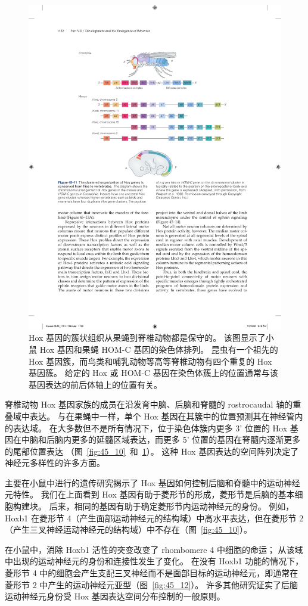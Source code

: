 \begin{figure}[htbp]
	\centering
	\includegraphics[width=0.7\linewidth]{chap45/fig_45_11}
	\caption{Hox 基因的簇状组织从果蝇到脊椎动物都是保守的。
		该图显示了小鼠 Hox 基因和果蝇 HOM-C 基因的染色体排列。
		昆虫有一个祖先的 Hox 基因簇，而鸟类和哺乳动物等高等脊椎动物有四个重复的 Hox 基因簇。
		给定的 Hox 或 HOM-C 基因在染色体簇上的位置通常与该基因表达的前后体轴上的位置有关\cite{wolpert2015principles}。 }
	\label{fig:45_11}
\end{figure}


脊椎动物 Hox 基因家族的成员在沿发育中脑、后脑和脊髓的 rostrocaudal 轴的重叠域中表达。
与在果蝇中一样，单个 Hox 基因在其簇中的位置预测其在神经管内的表达域。
在大多数但不是所有情况下，位于染色体簇内更多 3' 位置的 Hox 基因在中脑和后脑内更多的延髓区域表达，而更多 5' 位置的基因在脊髓内逐渐更多的尾部位置表达 （图~\ref{fig:45_10}~和~\ref{fig:45_11}）。
这种 Hox 基因表达的空间阵列决定了神经元多样性的许多方面。


主要在小鼠中进行的遗传研究揭示了 Hox 基因如何控制后脑和脊髓中的运动神经元特性。
我们在上面看到 Hox 基因有助于菱形节的形成，菱形节是后脑的基本细胞构建块。
后来，相同的基因有助于确定菱形节内运动神经元的身份。
例如，Hoxb1 在菱形节 4（产生面部运动神经元的结构域）中高水平表达，但在菱形节 2（产生三叉神经运动神经元的结构域）中不存在（图~\ref{fig:45_10}）。


在小鼠中，消除 Hoxb1 活性的突变改变了 rhombomere 4 中细胞的命运；
从该域中出现的运动神经元的身份和连接性发生了变化。 
在没有 Hoxb1 功能的情况下，菱形节 4 中的细胞会产生支配三叉神经而不是面部目标的运动神经元，即通常在菱形节 2 中产生的运动神经元亚型（图~\ref{fig:45_12}）。
许多其他研究证实了后脑运动神经元身份受 Hox 基因表达空间分布控制的一般原则。


